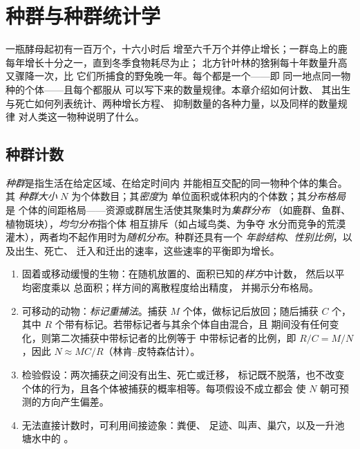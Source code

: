 \chapter{种群与种群统计学}\label{ch:b1:populations}

一瓶酵母起初有一百万个，十六小时后
增至六千万个并停止增长；一群岛上的鹿
每年增长十分之一，直到冬季食物耗尽为止；
北方针叶林的猞猁每十年数量升高又骤降一次，比
它们所捕食的野兔晚一年。每个都是一个\emph{}——即
同一地点同一物种的个体——且每个都服从
可以写下来的数量规律。本章介绍如何计数、
其出生与死亡如何列表统计、两种增长方程、
抑制数量的各种力量，以及同样的数量规律
对人类这一物种说明了什么。

\section{种群计数}

\begin{definition}[种群、密度与分布格局]\label{def:b1:populations:population}
\emph{种群}是指生活在给定区域、在给定时间内
并能相互交配的同一物种个体的集合。其
\emph{种群大小} $N$ 为个体数目；其\emph{密度}为
单位面积或体积内的个体数；其\emph{分布格局}是
个体的间距格局——资源或群居生活使其聚集时为\emph{集群分布}
（如鹿群、鱼群、植物斑块），\emph{均匀分布}指个体
相互排斥（如占域鸟类、为争夺
水分而竞争的荒漠灌木），两者均不起作用时为\emph{随机分布}。种群还具有一个
\emph{年龄结构}、\emph{性别比例}，以及出生、死亡、
迁入和迁出的速率，这些速率的平衡即为增长。
\end{definition}

\begin{method}[种群数量估计]\label{met:b1:populations:counting}
\begin{enumerate}
  \item 固着或移动缓慢的生物：在随机放置的、面积已知的\emph{样方}中计数，
        然后以平均密度乘以
        总面积；样方间的离散程度给出精度，
        并揭示分布格局。
  \item 可移动的动物：\emph{标记重捕法}。捕获 $M$
        个体，做标记后放回；随后捕获 $C$ 个，其中
        $R$ 个带有标记。若带标记者与其余个体自由混合，且
        期间没有任何变化，则第二次捕获中带标记者的比例等于
        中带标记者的比例，即 $R/C = M/N$，因此
        $N \approx MC/R$（林肯–皮特森估计）。
  \item 检验假设：两次捕获之间没有出生、死亡或迁移，
        标记既不脱落，也不改变
        个体的行为，且各个体被捕获的概率相等。每项假设不成立都会
        使 $N$ 朝可预测的方向产生偏差。
  \item 无法直接计数时，可利用间接迹象：粪便、
        足迹、叫声、巢穴，以及一升池塘水中的 。
\end{enumerate}
\end{method}


